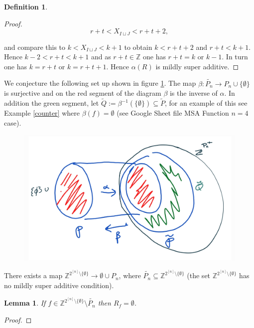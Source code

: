 \documentclass[a4paper,12pt]{article}
\newcounter{example}[]
\newtheorem{lemma}[theorem]{Lemma}
\theoremstyle{definition}
\newtheorem{definition}{Definition}[section]
\theoremstyle{indented}
\begin{document}
\begin{definition}
\begin{proof}
       $$r+t<X_{I \sqcup J}<r+t+2,$$ 
   
   and compare this to $k<X_{I \sqcup J}<k+1$ to obtain $k<r+t+2$ and $r+t<k+1$. Hence $k-2<r+t<k+1$ and as $r+t \in \mathbb{Z}$ one has $r+t= k$ or $k-1$. In turn one has $k=r+t$ or $k=r+t+1$. Hence $\alpha(R)$ is mildly super additive.   
\end{proof}

  We conjecture the following set up shown in figure \ref{relation}. The map $\beta: \tilde{P_{n}} \rightarrow P_n \cup \{\emptyset\}$ is surjective and on the red segment of the diagram $\beta$ is the inverse of $\alpha$. In addition the green segment, let $\tilde{Q}:= \beta^{-1}(\{\emptyset\}) \subseteq \tilde{P}$, for an example of this see Example \ref{counter} where $\beta(f)=\emptyset$ (see Google Sheet file MSA Function $n=4$ case).

 
 \begin{figure}[H]
    \centering
 \includegraphics[scale=0.15,angle=0]{29072020 pics/3alphabeta.jpg}  
    \caption{}
    \label{relation}
\end{figure}

 

 
     There exists a map $\mathbb{Z}^{ 2^{[n]} \setminus \{\emptyset\}}  \rightarrow  \emptyset \cup P_{n}$, where $\tilde{P_n}   \subseteq \mathbb{Z}^{ 2^{[n]}\setminus \{\emptyset\} }$ (the set $\mathbb{Z}^{ 2^{[n]} \setminus \{\emptyset\}}$ has no mildly super additive condition).
     
     \begin{lemma}\label{emptymapto}
     If $f \in \mathbb{Z}^{ 2^{[n]} \setminus \{\emptyset\}}  \setminus \tilde{P_n}$ then $R_f=\emptyset$.
     \end{lemma}
     
     \begin{proof}
            

\end{proof}
\end{definition}
\end{document}
